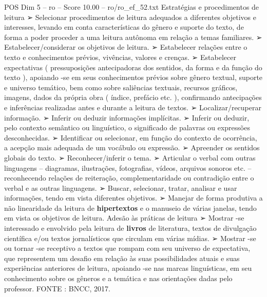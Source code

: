 \begin{textsample}{POS Dim 5 – ro – Score 10.00 – ro/ro\_ef\_52.txt}
Estratégias e procedimentos de leitura {\EmojiFont ➢} Selecionar procedimentos de leitura adequados a diferentes objetivos e interesses, levando em conta características do gênero e suporte do texto, de forma a poder proceder a uma leitura autônoma em relação a temas familiares. {\EmojiFont ➢} Estabelecer/considerar os objetivos de leitura. {\EmojiFont ➢} Estabelecer relações entre o texto e conhecimentos prévios, vivências, valores e crenças. {\EmojiFont ➢} Estabelecer expectativas ( pressuposições antecipadoras dos sentidos, da forma e da função do texto ), apoiando -se em seus conhecimentos prévios sobre gênero textual, suporte e universo temático, bem como sobre saliências textuais, recursos gráficos, imagens, dados da própria obra ( índice, prefácio etc. ), confirmando antecipações e inferências realizadas antes e durante a leitura de textos. {\EmojiFont ➢} Localizar/recuperar informação. {\EmojiFont ➢} Inferir ou deduzir informações implícitas. {\EmojiFont ➢} Inferir ou deduzir, pelo contexto semântico ou linguístico, o significado de palavras ou expressões desconhecidas. {\EmojiFont ➢} Identificar ou selecionar, em função do contexto de ocorrência, a acepção mais adequada de um vocábulo ou expressão. {\EmojiFont ➢} Apreender os sentidos globais do texto. {\EmojiFont ➢} Reconhecer/inferir o tema. {\EmojiFont ➢} Articular o verbal com outras linguagens – diagramas, ilustrações, fotografias, vídeos, arquivos sonoros etc. – reconhecendo relações de reiteração, complementaridade ou contradição entre o verbal e as outras linguagens. {\EmojiFont ➢} Buscar, selecionar, tratar, analisar e usar informações, tendo em vista diferentes objetivos. {\EmojiFont ➢} Manejar de forma produtiva a não linearidade da leitura de \textbf{hipertextos} e o manuseio de várias janelas, tendo em vista os objetivos de leitura.
Adesão às práticas de leitura {\EmojiFont ➢} Mostrar -se interessado e envolvido pela leitura de \textbf{livros} de literatura, textos de divulgação científica e/ou textos jornalísticos que circulam em várias mídias. {\EmojiFont ➢} Mostrar -se ou tornar -se receptivo a textos que rompam com seu universo de expectativa, que representem um desafio em relação às suas possibilidades atuais e suas experiências anteriores de leitura, apoiando -se nas marcas linguísticas, em seu conhecimento sobre os gêneros e a temática e nas orientações dadas pelo professor.
FONTE : BNCC, 2017.

\end{textsample}
